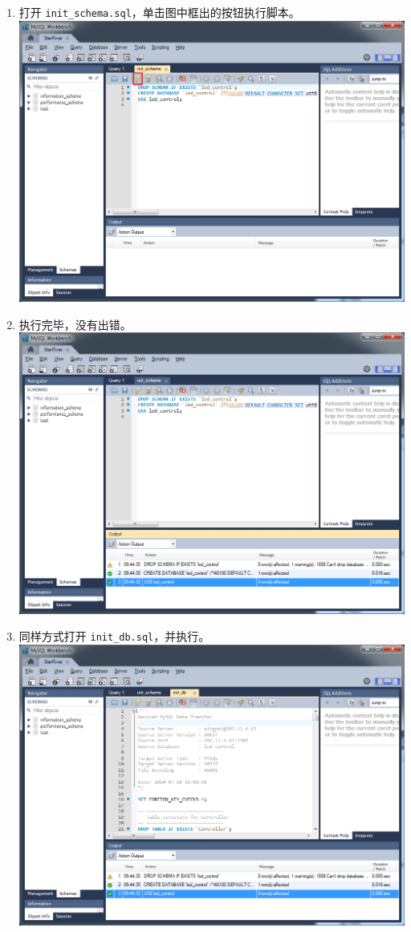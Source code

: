 \begin{enumerate}
\item
  打开 \texttt{init\_schema.sql}，单击图中框出的按钮执行脚本。
  \includegraphics{img/db_init_7.png}
\item
  执行完毕，没有出错。 \includegraphics{img/db_init_8.png}
\item
  同样方式打开 \texttt{init\_db.sql}，并执行。
  \includegraphics{img/db_init_9.png}

\end{enumerate}
